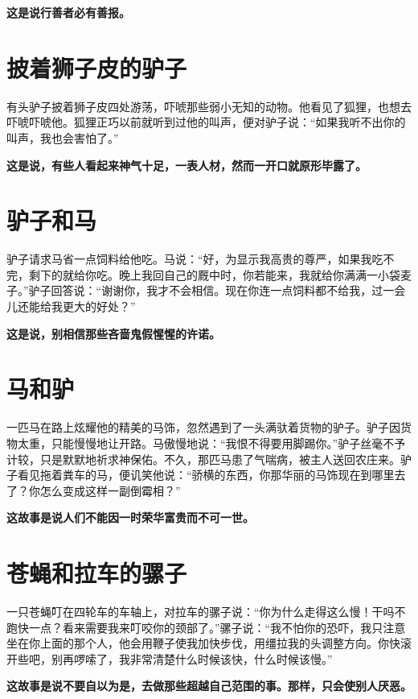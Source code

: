 {\bfseries \color{red}这是说行善者必有善报。}

\section{披着狮子皮的驴子}

有头驴子披着狮子皮四处游荡，吓唬那些弱小无知的动物。他看见了狐狸，也想去吓唬吓唬他。狐狸正巧以前就听到过他的叫声，便对驴子说：“如果我听不出你的叫声，我也会害怕了。”

{\bfseries \color{red}这是说，有些人看起来神气十足，一表人材，然而一开口就原形毕露了。}

\section{驴子和马}

驴子请求马省一点饲料给他吃。马说：“好，为显示我高贵的尊严，如果我吃不完，剩下的就给你吃。晚上我回自己的厩中时，你若能来，我就给你满满一小袋麦子。”驴子回答说：“谢谢你，我才不会相信。现在你连一点饲料都不给我，过一会儿还能给我更大的好处？”

{\bfseries \color{red}这是说，别相信那些吝啬鬼假惺惺的许诺。}

\section{马和驴}

一匹马在路上炫耀他的精美的马饰，忽然遇到了一头满驮着货物的驴子。驴子因货物太重，只能慢慢地让开路。马傲慢地说：“我恨不得要用脚踢你。”驴子丝毫不予计较，只是默默地祈求神保佑。不久，那匹马患了气喘病，被主人送回农庄来。驴子看见拖着粪车的马，便讥笑他说：“骄横的东西，你那华丽的马饰现在到哪里去了？你怎么变成这样一副倒霉相？”

{\bfseries \color{red}这故事是说人们不能因一时荣华富贵而不可一世。}

\section{苍蝇和拉车的骡子}

一只苍蝇叮在四轮车的车轴上，对拉车的骡子说：“你为什么走得这么慢！干吗不跑快一点？看来需要我来叮咬你的颈部了。”骡子说：“我不怕你的恐吓，我只注意坐在你上面的那个人，他会用鞭子使我加快步伐，用缰拉我的头调整方向。你快滚开些吧，别再啰嗦了，我非常清楚什么时候该快，什么时候该慢。”

{\bfseries \color{red}这故事是说不要自以为是，去做那些超越自己范围的事。那样，只会使别人厌恶。}

